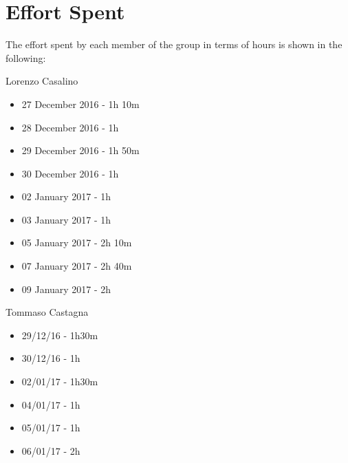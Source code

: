 \section{Effort Spent}

The effort spent by each member of the group in terms of hours is shown in the following:

Lorenzo Casalino

\begin{itemize}
	\item 27 December 2016 - 1h 10m
	\item 28 December 2016 - 1h
	\item 29 December 2016 - 1h 50m
	\item 30 December 2016 - 1h
	\item 02 January  2017 - 1h
	\item 03 January  2017 - 1h
	\item 05 January  2017 - 2h 10m
	\item 07 January  2017 - 2h 40m
	\item 09 January 2017 - 2h
\end{itemize}

Tommaso Castagna

\begin{itemize}
	\item 29/12/16 - 1h30m
	\item 30/12/16 - 1h
	\item 02/01/17 - 1h30m
	\item 04/01/17 - 1h
	\item 05/01/17 - 1h
	\item 06/01/17 - 2h
\end{itemize}
